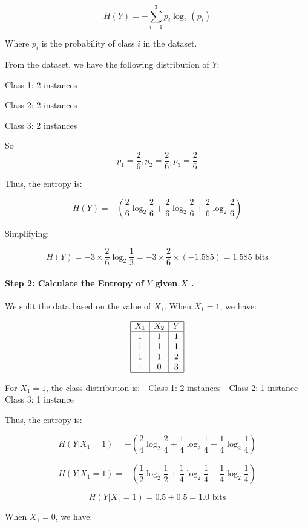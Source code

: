 \documentclass[12pt]{article}
\begin{document}
\[
  H(Y) = - \sum_{i=1}^{3} p_i \log_2(p_i)
\]

Where $p_i$ is the probability of class $i$ in the dataset.

From the dataset, we have the following distribution of $Y$:

Class 1: 2 instances

Class 2: 2 instances

Class 3: 2 instances

So
\[
  p_1 = \frac{2}{6},
  p_2 = \frac{2}{6},
  p_3 = \frac{2}{6}
\]

Thus, the entropy is:

\[
  H(Y) = -\left( \frac{2}{6} \log_2 \frac{2}{6} + \frac{2}{6} \log_2 \frac{2}{6} + \frac{2}{6} \log_2 \frac{2}{6} \right)
\]

Simplifying:

\[
  H(Y) = -3 \times \frac{2}{6} \log_2 \frac{1}{3} = -3 \times \frac{2}{6} \times (-1.585) = 1.585 \text{ bits}
\]

\paragraph{Step 2: Calculate the Entropy of $Y$ given $X_1$.}

We split the data based on the value of $X_1$. When $X_1 = 1$, we have:

\[
  \begin{array}{|c|c|c|}
    \hline
    X_1 & X_2 & Y \\
    \hline
    1   & 1   & 1 \\
    1   & 1   & 1 \\
    1   & 1   & 2 \\
    1   & 0   & 3 \\
    \hline
  \end{array}
\]

For $X_1 = 1$, the class distribution is:
- Class 1: 2 instances
- Class 2: 1 instance
- Class 3: 1 instance

Thus, the entropy is:

\[
  H(Y|X_1 = 1) = -\left( \frac{2}{4} \log_2 \frac{2}{4} + \frac{1}{4} \log_2 \frac{1}{4} + \frac{1}{4} \log_2 \frac{1}{4} \right)
\]

\[
  H(Y|X_1 = 1) = -\left( \frac{1}{2} \log_2 \frac{1}{2} + \frac{1}{4} \log_2 \frac{1}{4} + \frac{1}{4} \log_2 \frac{1}{4} \right)
\]

\[
  H(Y|X_1 = 1) = 0.5 + 0.5 = 1.0 \text{ bits}
\]

When $X_1 = 0$, we have:
\end{document}
